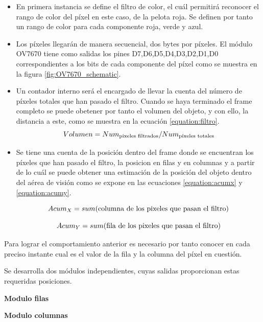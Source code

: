 \begin{itemize}
	\item En primera instancia se define el filtro de color, el cuál permitirá reconocer el rango de color del píxel en este caso, de la pelota roja. Se definen por tanto un rango de color para cada componente roja, verde y azul.
	\item Los píxeles llegarán de manera secuencial, dos bytes por píxeles. El módulo OV7670 tiene como salidas los pines D7,D6,D5,D4,D3,D2,D1,D0 correspondientes a los bits de cada componente del píxel como se muestra en la figura \ref{fig:OV7670_schematic}.
	\item Un contador interno será el encargado de llevar la cuenta del número de píxeles totales que han pasado el filtro. Cuando se haya terminado el frame completo se puede obetener por tanto el volumen del objeto, y con ello, la distancia a este, como se muestra en la ecuación \ref{equation:filtro}.
	\begin{equation} \label{equation:filtro}
		Volumen = Num_{\textup{pixeles filtrados}}/Num_{\textup{píxeles totales}}
	\end{equation}
	\item Se tiene una cuenta de la posición dentro del frame donde se encuentran los píxeles que han pasado el filtro, la posicion en filas y en columnas y a partir de lo cuál se puede obtener una estimación de la posición del objeto dentro del aérea de visión como se expone en las ecuaciones \ref{equation:acumx} y \ref{equation:acumy}.
	
	\begin{equation}\label{equation:acumx}
		Acum_{X} = sum(\textup{columna de los pixeles que pasan el filtro})
	\end{equation}
	
	\begin{equation}\label{equation:acumy}
		Acum_{Y} = sum(\textup{fila de los pixeles que pasan el filtro})
 	\end{equation}
	
	
	\end{itemize}

	Para lograr el comportamiento anterior es necesario por tanto conocer en cada preciso instante cual es el valor de la fila y la columna del píxel en cuestión. 
	
	Se desarrolla dos módulos independientes, cuyas salidas proporcionan estas requeridas posiciones.
	
	\textbf{Modulo filas}
	
	\textbf{Modulo columnas}
	
